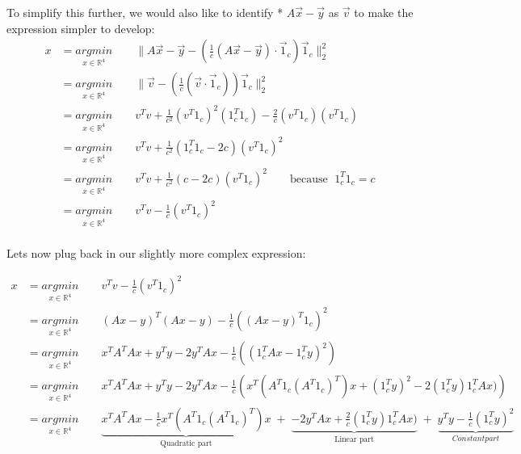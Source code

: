\documentclass{article}
\begin{document}
    To simplify this further, we would also like to identify 
    * $ A\vec{x}-\vec{y}$ as $\vec{v}$
    to make the expression simpler to develop:
    \begin{align*}
	      x &= \underset{x \in \mathbb{R}^4}{argmin} \qquad \| A\vec{x}-\vec{y} - \left( \frac{1}{c} (A\vec{x}-\vec{y})\cdot\vec{1}_{c}\right) \vec{1}_{c} \|_2^2 \\
	      &= \underset{x \in \mathbb{R}^4}{argmin} \qquad \| \vec{v} - \left( \frac{1}{c} (\vec{v}\cdot\vec{1}_{c}) \right) \vec{1}_{c} \|_2^2 \\
	      &= \underset{x \in \mathbb{R}^4}{argmin} \qquad v^{T}v + \frac{1}{c^2} (v^{T}1_{c})^2 (1_{c}^{T}1_{c}) - \frac{2}{c} (v^{T}1_{c})(v^{T}1_{c}) \\
	      &= \underset{x \in \mathbb{R}^4}{argmin} \qquad v^{T}v + \frac{1}{c^2} (1_{c}^{T}1_{c} - 2c)(v^{T}1_{c})^2 \\
	      &= \underset{x \in \mathbb{R}^4}{argmin} \qquad v^{T}v + \frac{1}{c^2} (c - 2c)(v^{T}1_{c})^2 \qquad \text{because } \; 1_{c}^{T}1_{c} = c\\
	      &= \underset{x \in \mathbb{R}^4}{argmin} \qquad v^{T}v - \frac{1}{c} (v^{T}1_{c})^2 \\          
    \end{align*}

    Lets now plug back in our slightly more complex expression:

    \begin{align*}
	      x &= \underset{x \in \mathbb{R}^4}{argmin} \qquad v^{T}v - \frac{1}{c} (v^{T}1_{c})^2 \\
	      &= \underset{x \in \mathbb{R}^4}{argmin} \qquad (Ax-y)^{T}(Ax-y) - \frac{1}{c} \left( (Ax-y)^{T}1_{c} \right)^2 \\
	      &= \underset{x \in \mathbb{R}^4}{argmin} \qquad x^{T}A^{T}Ax + y^{T}y -2y^{T}Ax - \frac{1}{c} \left( (1_{c}^{T}Ax-1_{c}^{T}y)^2 \right) \\
	      &= \underset{x \in \mathbb{R}^4}{argmin} \qquad x^{T}A^{T}Ax + y^{T}y -2y^{T}Ax - \frac{1}{c} \left( x^{T}(A^{T}1_{c}(A^{T}1_{c})^{T})x + (1_{c}^{T}y)^2 -2(1_{c}^{T}y)1_{c}^{T}Ax ) \right) \\
	      &= \underset{x \in \mathbb{R}^4}{argmin} \qquad \underbrace{x^{T}A^{T}Ax -\frac{1}{c} x^{T}(A^{T}1_{c}(A^{T}1_{c})^{T})x}_{\text{Quadratic part}} \; + \; \underbrace{-2y^{T}Ax +\frac{2}{c}(1_{c}^{T}y)1_{c}^{T}Ax )}_{\text{Linear part}} \; + \; \underbrace{y^{T}y -\frac{1}{c}(1_{c}^{T}y)^2}_{Constant part} \\
    \end{align*}
\end{document}
